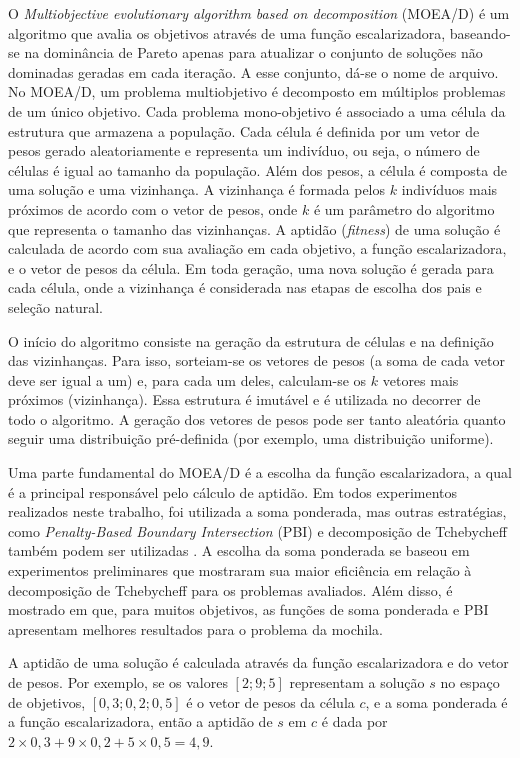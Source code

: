 O \textit{Multiobjective evolutionary algorithm based on decomposition} (MOEA/D) \cite{Zhang2007} é um algoritmo que avalia os objetivos através de uma função escalarizadora, baseando-se na dominância de Pareto apenas para atualizar o conjunto de soluções não dominadas geradas em cada iteração. A esse conjunto, dá-se o nome de arquivo. No MOEA/D, um problema multiobjetivo é decomposto em múltiplos problemas de um único objetivo. Cada problema mono-objetivo é associado a uma célula da estrutura que armazena a população. Cada célula é definida por um vetor de pesos gerado aleatoriamente e representa um indivíduo, ou seja, o número de células é igual ao tamanho da população. Além dos pesos, a célula é composta de uma solução e uma vizinhança. A vizinhança é formada pelos $k$ indivíduos mais próximos de acordo com o vetor de pesos, onde $k$ é um parâmetro do algoritmo que representa o tamanho das vizinhanças. A aptidão (\textit{fitness}) de uma solução é calculada de acordo com sua avaliação em cada objetivo, a função escalarizadora, e o vetor de pesos da célula. Em toda geração, uma nova solução é gerada para cada célula, onde a vizinhança é considerada nas etapas de escolha dos pais e seleção natural.

O início do algoritmo consiste na geração da estrutura de células e na definição das vizinhanças. Para isso, sorteiam-se os vetores de pesos (a soma de cada vetor deve ser igual a um) e, para cada um deles, calculam-se os $k$ vetores mais próximos (vizinhança). Essa estrutura é imutável e é utilizada no decorrer de todo o algoritmo. A geração dos vetores de pesos pode ser tanto aleatória quanto seguir uma distribuição pré-definida (por exemplo, uma distribuição uniforme).

Uma parte fundamental do MOEA/D é a escolha da função escalarizadora, a qual é a principal responsável pelo cálculo de aptidão. Em todos experimentos realizados neste trabalho, foi utilizada a soma ponderada, mas outras estratégias, como \textit{Penalty-Based Boundary Intersection} (PBI) e decomposição de Tchebycheff também podem ser utilizadas \cite{Zhang2007}. A escolha da soma ponderada se baseou em experimentos preliminares que mostraram sua maior eficiência em relação à decomposição de Tchebycheff para os problemas avaliados. Além disso, é mostrado em  que, para muitos objetivos, as funções de soma ponderada e PBI apresentam melhores resultados para o problema da mochila.

A aptidão de uma solução é calculada através da função escalarizadora e do vetor de pesos. Por exemplo, se os valores $[2; 9; 5]$ representam a solução $s$ no espaço de objetivos, $[0,3; 0,2; 0,5]$ é o vetor de pesos da célula $c$, e a soma ponderada é a função escalarizadora, então a aptidão de $s$ em $c$ é dada por $2 \times 0,3 + 9 \times 0,2 + 5 \times 0,5 = 4,9$.

